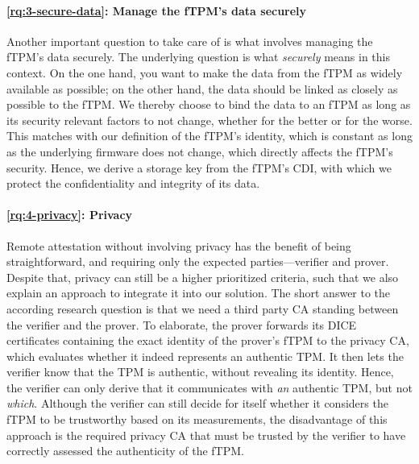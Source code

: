 \paragraph{\ref{rq:3-secure-data}: Manage the fTPM's data securely}
Another important question to take care of is what involves managing the fTPM's data securely.
The underlying question is what \emph{securely} means in this context.
On the one hand, you want to make the data from the fTPM as widely available as possible; on the other hand, the data should be linked as closely as possible to the fTPM\@.
We thereby choose to bind the data to an fTPM as long as its security relevant factors to not change, whether for the better or for the worse.
This matches with our definition of the fTPM's identity, which is constant as long as the underlying firmware does not change, which directly affects the fTPM's security.
Hence, we derive a storage key from the fTPM's \ac{CDI}, with which we protect the confidentiality and integrity of its data.

\paragraph{\ref{rq:4-privacy}: Privacy}
Remote attestation without involving privacy has the benefit of being straightforward, and requiring only the expected parties---verifier and prover.
Despite that, privacy can still be a higher prioritized criteria, such that we also explain an approach to integrate it into our solution.
The short answer to the according research question is that we need a third party \ac{CA} standing between the verifier and the prover.
To elaborate, the prover forwards its \ac{DICE} certificates containing the exact identity of the prover's \ac{fTPM} to the privacy \ac{CA}, which evaluates whether it indeed represents an authentic TPM\@.
It then lets the verifier know that the TPM is authentic, without revealing its identity.
Hence, the verifier can only derive that it communicates with \emph{an} authentic TPM, but not \emph{which}.
Although the verifier can still decide for itself whether it considers the \ac{fTPM} to be trustworthy based on its measurements, the disadvantage of this approach is the required privacy \ac{CA} that must be trusted by the verifier to have correctly assessed the authenticity of the \ac{fTPM}.




